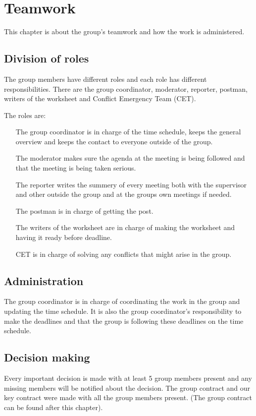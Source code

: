 \chapter{Teamwork}
This chapter is about the group's teamwork and how the work is administered.
\section{Division of roles}
The group members have different roles and each role has different responsibilities. There are the group coordinator, moderator, reporter, postman, writers of the worksheet and Conflict Emergency Team (CET).

The roles are:
\begin{itemize}
\item [The group coordinator is in charge of the time schedule, keeps the general overview and keeps the contact to everyone outside of the group.]
\item [The moderator makes sure the agenda at the meeting is being followed and that the meeting is being taken serious.]
\item [The reporter writes the summery of every meeting both with the supervisor and other outside the group and at the groups own meetings if needed.]
\item [The postman is in charge of getting the post.]
\item [The writers of the worksheet are in charge of making the worksheet and having it ready before deadline.]
\item [CET is in charge of solving any conflicts that might arise in the group.]
\end{itemize}

\section{Administration}
The group coordinator is in charge of coordinating the work in the group and updating the time schedule. It is also the group coordinator's responsibility to make the deadlines and that the group is following these deadlines on the time schedule.
\section{Decision making}
Every important decision is made with at least 5 group members present and any missing members will be notified about the decision. The group contract and our key contract were made with all the group members present. (The group contract can be found after this chapter).
